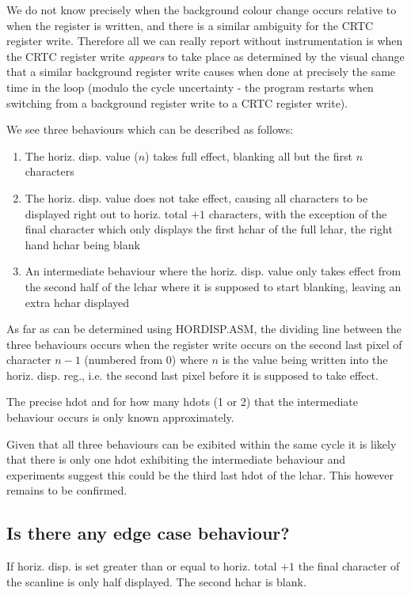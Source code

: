 \documentclass[a4paper,10pt]{amsart}
\begin{document}
We do not know precisely when the background colour change occurs relative
to when the register is written, and there is a similar ambiguity for the
CRTC register write. Therefore all we can really report without instrumentation
is when the CRTC register write \emph{appears} to take place as determined by
the visual change that a similar background register write causes when done at
precisely the same time in the loop (modulo the cycle uncertainty - the program
restarts when switching from a background register write to a CRTC register
write).

We see three behaviours which can be described as follows:

\begin{enumerate}
\item The horiz. disp. value ($n$) takes full effect, blanking all but the
first $n$ characters
\item The horiz. disp. value does not take effect, causing all characters
to be displayed right out to horiz. total $+1$ characters, with the exception
of the final character which only displays the first hchar of the full lchar,
the right hand hchar being blank
\item An intermediate behaviour where the horiz. disp. value only takes effect
from the second half of the lchar where it is supposed to start blanking, leaving
an extra hchar displayed
\end{enumerate}

As far as can be determined using HORDISP.ASM, the dividing line between the
three behaviours occurs when the register write occurs on the second last pixel
of character $n - 1$ (numbered from $0$) where $n$ is the value being written
into the horiz. disp. reg., i.e. the second last pixel before it is supposed
to take effect.

The precise hdot and for how many hdots (1 or 2) that the intermediate
behaviour occurs is only known approximately.

Given that all three behaviours can be exibited within the same cycle it is
likely that there is only one hdot exhibiting the intermediate behaviour
and experiments suggest this could be the third last hdot of the lchar. This
however remains to be confirmed.

\subsection{Is there any edge case behaviour?}

If horiz. disp. is set greater than or equal to horiz. total $+1$ the final
character of the scanline is only half displayed. The second hchar is blank.
\end{document}
